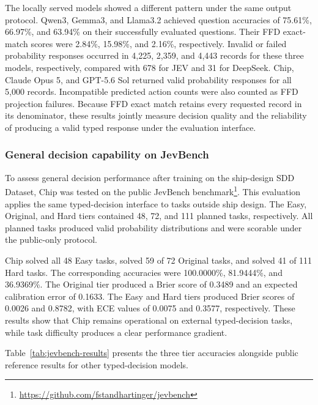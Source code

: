 \documentclass[a4paper,fleqn]{cas-dc}
\begin{document}
The locally served models showed a different pattern under the same output
protocol. Qwen3, Gemma3, and Llama3.2 achieved question accuracies of 75.61\%,
66.97\%, and 63.94\% on their successfully evaluated questions. Their FFD
exact-match scores were 2.84\%, 15.98\%, and 2.16\%, respectively. Invalid or
failed probability responses occurred in 4,225, 2,359, and 4,443 records for these
three models, respectively, compared with 678 for JEV and 31
for DeepSeek. Chip, Claude Opus 5, and GPT-5.6 Sol returned valid probability
responses for all 5,000 records. Incompatible predicted action counts were also
counted as FFD projection failures. Because FFD exact match retains every
requested record in its denominator, these results jointly
measure decision quality and the reliability of producing a valid typed response
under the evaluation interface.

\subsubsection{General decision capability on JevBench}
\label{sec:jevbench-results}

To assess general decision performance after training on the ship-design
SDD Dataset, Chip was tested on the public JevBench
benchmark\footnote{\url{https://github.com/fstandhartinger/jevbench}}.
This evaluation applies the same typed-decision interface to tasks outside ship
design. The Easy, Original, and Hard tiers contained 48, 72, and 111 planned tasks,
respectively. All planned tasks produced valid probability distributions and were
scorable under the public-only protocol.

Chip solved all 48 Easy tasks, solved 59 of 72 Original tasks, and solved 41
of 111 Hard tasks. The corresponding accuracies were 100.0000\%, 81.9444\%, and
36.9369\%. The Original tier produced a Brier score of 0.3489 and an expected
calibration error of 0.1633. The Easy and Hard tiers produced Brier scores of
0.0026 and 0.8782, with ECE values of 0.0075 and 0.3577,
respectively. These results show that Chip remains operational on external typed-decision tasks, while task difficulty produces a
clear performance gradient.

Table~\ref{tab:jevbench-results} presents the three tier accuracies alongside
public reference results for other typed-decision models.
\end{document}
